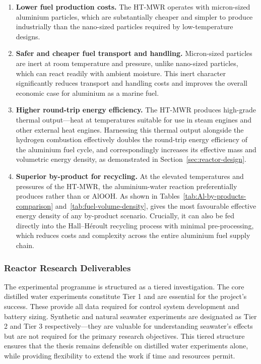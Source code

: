 \documentclass[12pt]{article}
\begin{document}
\begin{enumerate}
    \item \textbf{Lower fuel production costs.} The HT-MWR operates with 
    micron-sized aluminium particles, which are substantially cheaper and simpler 
    to produce industrially than the nano-sized particles required by low-temperature 
    designs.

    \item \textbf{Safer and cheaper fuel transport and handling.} Micron-sized 
    particles are inert at room temperature and pressure, unlike nano-sized 
    particles, which can react readily with ambient moisture. This inert character 
    significantly reduces transport and handling costs and improves the overall 
    economic case for aluminium as a marine fuel.

    \item \textbf{Higher round-trip energy efficiency.} The HT-MWR produces 
    high-grade thermal output---heat at temperatures suitable for use in steam 
    engines and other external heat engines. Harnessing this thermal output 
    alongside the hydrogen combustion effectively doubles the round-trip energy 
    efficiency of the aluminium fuel cycle, and correspondingly increases its 
    effective mass and volumetric energy density, as demonstrated in 
    Section~\ref{sec:reactor-design}.

    \item \textbf{Superior by-product for recycling.} At the elevated temperatures 
    and pressures of the HT-MWR, the aluminium-water reaction preferentially 
    produces  rather than  or AlOOH. As shown in 
    Tables~\ref{tab:Al-by-products-comparison} and~\ref{tab:fuel-volume-density},  gives 
    the most favourable effective energy density of any by-product scenario. 
    Crucially, it can also be fed directly into the Hall--H\'{e}roult recycling 
    process with minimal pre-processing, which reduces costs and complexity across 
    the entire aluminium fuel supply chain.
\end{enumerate}

\subsubsection*{Reactor Research Deliverables}

The experimental programme is structured as a tiered investigation. The core 
distilled water experiments constitute Tier 1 and are essential for the project's 
success. These provide all data required for control system development and 
battery sizing. Synthetic and natural seawater experiments are designated as 
Tier 2 and Tier 3 respectively---they are valuable for understanding seawater's 
effects but are not required for the primary research objectives. This tiered 
structure ensures that the thesis remains defensible on distilled water 
experiments alone, while providing flexibility to extend the work if time and 
resources permit.
\end{document}
